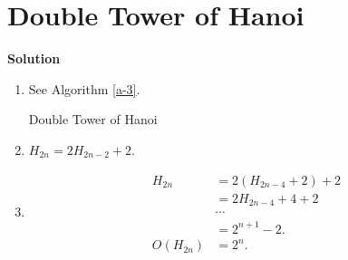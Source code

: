 \documentclass{../../cls/sig-alternate-05-2015}
\begin{document}
\section{Double Tower of Hanoi}
\textbf{Solution}\begin{enumerate}[label=(\alph*)]
	\item See Algorithm \ref{a-3}.
	\begin{algorithm}
		\caption{Double Tower of Hanoi}
		\label{a-3}
		\begin{algorithmic}
			\State \Return
			\State {}
			\State {}
			\Else
			\State {}
			\State {}
			\State {}
			\EndIf
			\EndProcedure
		\end{algorithmic}
	\end{algorithm}

	\item $H_{2n} = 2H_{2n - 2} + 2$.
	\item \begin{align}
		H_{2n} & = 2(H_{2n - 4} + 2) + 2\\
		& = 2H_{2n - 4} + 4 + 2\\
		& \cdots\\
		& = 2^{n + 1} - 2.\\
		O(H_{2n}) & = 2^n.
	\end{align}
\end{enumerate}
\end{document}
